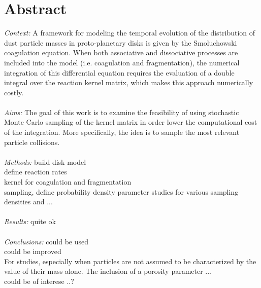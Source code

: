 \cleardoublepage\chapter*{Abstract}
\thispagestyle{NoHeader}

\textit{Context:}
A framework for modeling the temporal evolution of the distribution of 
dust particle masses in proto-planetary disks is given by the Smoluchowski coagulation equation.
When both associative and dissociative processes are included into the model 
(i.e. coagulation and fragmentation), the numerical integration of this differential equation 
requires the evaluation of a double integral over the reaction kernel matrix, which makes this 
approach numerically costly.
\\ \ \\
\textit{Aims:}
The goal of this work is to examine the feasibility of using stochastic Monte Carlo sampling 
of the kernel matrix in order lower the computational cost of the integration. 
More specifically, the idea is to sample the most relevant particle collisions.
\\ \ \\
\textit{Methods:}
build disk model \\
define reaction rates \\
kernel for coagulation and fragmentation \\
sampling, define probability density
parameter studies for various sampling densities and ...
\\ \ \\
\textit{Results:}
quite ok 
\\ \ \\
\textit{Conclusions:}
could be used \\
could be improved \\
For studies, especially when particles are not assumed to be characterized by the value of their 
mass alone. The inclusion of a porosity parameter ... \\
could be of interese ..?
\\

 \\
 \\
 \\

